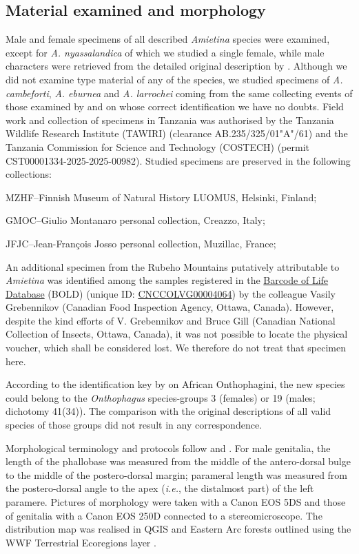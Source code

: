 \documentclass[fleqn,10pt,lineno]{wlpeerj}
\begin{document}
\subsection*{Material examined and morphology}
Male and female specimens of all described \textit{Amietina} species were examined, except for \textit{A. nyassalandica} of which we studied a single female, while male characters were retrieved from the detailed original description by \cite{branco1989deux}. Although we did not examine type material of any of the species, we studied specimens of \textit{A. cambeforti}, \textit{A. eburnea} and \textit{A. larrochei} coming from the same collecting events of those examined by \cite{branco1989deux} and on whose correct identification we have no doubts. Field work and collection of specimens in Tanzania was authorised by the Tanzania Wildlife Research Institute (TAWIRI) (clearance AB.235/325/01"A"/61) and the Tanzania Commission for Science and Technology (COSTECH) (permit CST00001334-2025-2025-00982).
Studied specimens are preserved in the following collections:

MZHF--Finnish Museum of Natural History LUOMUS, Helsinki, Finland; 

GMOC--Giulio Montanaro personal collection, Creazzo, Italy;

JFJC--Jean-Fran\c{c}ois Josso personal collection, Muzillac, France;

An additional specimen from the Rubeho Mountains putatively attributable to \textit{Amietina} was identified among the samples registered in the \href{https://boldsystems.org/}{Barcode of Life Database} (BOLD) (unique ID: \href{https://boldsystems.org/index.php/Public_RecordView?processid=VGH254-12}{CNCCOLVG00004064}) by the colleague Vasily Grebennikov (Canadian Food Inspection Agency, Ottawa, Canada). However, despite the kind efforts of V. Grebennikov and Bruce Gill (Canadian National Collection of Insects, Ottawa, Canada), it was not possible to locate the physical voucher, which shall be considered lost. We therefore do not treat that specimen here.

According to the identification key by \cite{orbigny1913synopsis} on African Onthophagini, the new species could belong to the \textit{Onthophagus} species-groups 3 (females) or 19 (males; dichotomy 41(34)). The comparison with the original descriptions of all valid species of those groups did not result in any correspondence.

Morphological terminology and protocols follow \cite{montanaro2024computable} and \cite{tarasov2011phylogenetic}. For male genitalia, the length of the phallobase was measured from the middle of the antero-dorsal bulge to the middle of the postero-dorsal margin; parameral length was measured from the postero-dorsal angle to the apex (\textit{i.e.}, the distalmost part) of the left paramere. Pictures of morphology were taken with a Canon EOS 5DS and those of genitalia with a Canon EOS 250D connected to a stereomicroscope. The distribution map was realised in QGIS \citep{QGIS_software} and Eastern Arc forests outlined using the WWF Terrestrial Ecoregions layer \citep{olson2001terrestrial}.
\end{document}
